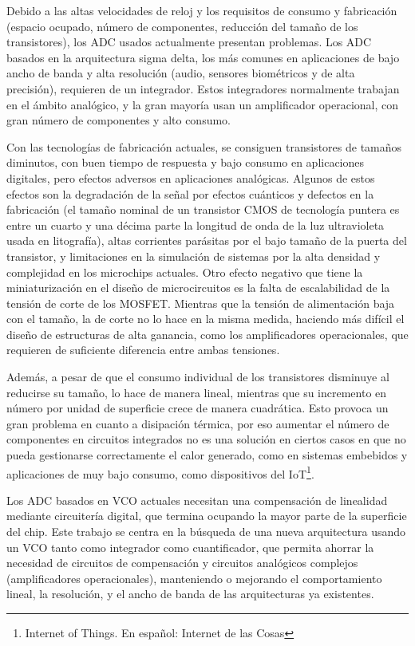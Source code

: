\documentclass[12pt]{report} %
\begin{document}
	Debido a las altas velocidades de reloj y los requisitos de consumo y fabricación (espacio ocupado, número de componentes, reducción del tamaño de los transistores), los ADC usados actualmente presentan problemas. Los ADC basados en la arquitectura sigma delta, los más comunes en aplicaciones de bajo ancho de banda y alta resolución (audio, sensores biométricos y de alta precisión), requieren de un integrador. Estos integradores normalmente trabajan en el ámbito analógico, y la gran mayoría usan un amplificador operacional, con gran número de componentes y alto consumo.
	
	Con las tecnologías de fabricación actuales, se consiguen transistores de tamaños diminutos, con buen tiempo de respuesta y bajo consumo en aplicaciones digitales, pero efectos adversos en aplicaciones analógicas.
	Algunos de estos efectos son la degradación de la señal por efectos cuánticos y defectos en la fabricación (el tamaño nominal de un transistor CMOS de tecnología puntera es entre un cuarto y una décima parte la longitud de onda de la luz ultravioleta usada en litografía), altas corrientes parásitas por el bajo tamaño de la puerta del transistor, y limitaciones en la simulación de sistemas por la alta densidad y complejidad en los microchips actuales. Otro efecto negativo que tiene la miniaturización en el diseño de microcircuitos es la falta de escalabilidad de la tensión de corte de los MOSFET. Mientras que la tensión de alimentación baja con el tamaño, la de corte no lo hace en la misma medida, haciendo más difícil el diseño de estructuras de alta ganancia, como los amplificadores operacionales, que requieren de suficiente diferencia entre ambas tensiones. %
	
	Además, a pesar de que el consumo individual de los transistores disminuye al reducirse su tamaño, lo hace de manera lineal, mientras que su incremento en número por unidad de superficie crece de manera cuadrática. Esto provoca un gran problema en cuanto a disipación térmica, por eso aumentar el número de componentes en circuitos integrados no es una solución en ciertos casos en que no pueda gestionarse correctamente el calor generado, como en sistemas embebidos y aplicaciones de muy bajo consumo, como dispositivos del IoT\footnote{Internet of Things. En español: Internet de las Cosas}.
	
	Los ADC basados en VCO actuales necesitan una compensación de linealidad mediante circuitería digital, que termina ocupando la mayor parte de la superficie del chip. Este trabajo se centra en la búsqueda de una nueva arquitectura usando un VCO tanto como integrador como cuantificador, que permita ahorrar la necesidad de circuitos de compensación y circuitos analógicos complejos (amplificadores operacionales), manteniendo o mejorando el comportamiento lineal, la resolución, y el ancho de banda de las arquitecturas ya existentes.
	
\end{document}

